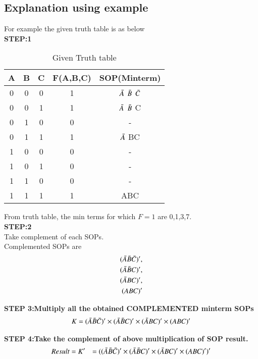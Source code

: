 \documentclass{article}
\begin{document}
\subsection{Explanation using example}
For example the given truth table is as below\\
\textbf{STEP:1}\\
\begin{table} [h!]
    \centering
    \begin{tabular}{ | c | c | c | c |c| }
    \hline
    A & B & C & F(A,B,C) & SOP(Minterm)\\
    \hline
    0 & 0 & 0 & 1  & $\Bar{A}$ $\Bar{B}$ $\Bar{C}$\\
    0 & 0 & 1 & 1  & $\Bar{A}$ $\Bar{B}$ C\\
    0 & 1 & 0 & 0 &   - \\
    0 & 1 & 1 & 1 & $\Bar{A}$ BC\\
    1 & 0 & 0 & 0 &   -\\
    1 & 0 & 1 & 0 &   -\\
    1 & 1 & 0 & 0 &   -\\
    1 & 1 & 1 & 1 & ABC\\
     \hline
\end{tabular}
\caption{Given Truth table}
\label{Table1}
\end{table}
\newline
From truth table, the min terms for which $F=1$ are 0,1,3,7.\\
\textbf{STEP:2}\\
Take complement of each SOPs.\\
Complemented SOPs are\\
\begin{align}
    (\Bar{A} \Bar{B} \Bar{C})',\\
    (\Bar{A} \Bar{B} C)',\\
    (\Bar{A} BC)',\\
    (ABC)'
\end{align}

\textbf{STEP 3:Multiply all the obtained COMPLEMENTED minterm SOPs}\\
\begin{align}
    K=(\Bar{A} \Bar{B} \Bar{C})' \times (\Bar{A} \Bar{B} C)' \times
    (\Bar{A} BC)' \times
    (ABC)'
\end{align}

\textbf{STEP 4:Take the complement of above multiplication of SOP result.}\\
\begin{align}
Result &=K'    
       &=((\Bar{A} \Bar{B} \Bar{C})' \times
    (\Bar{A} \Bar{B} C)' \times
    (\Bar{A} BC)' \times
    (ABC)')'
\end{align}
\end{document}
